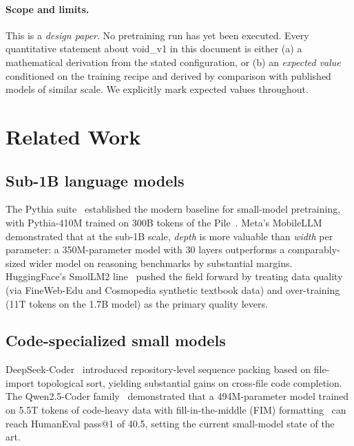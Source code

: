 \documentclass[11pt,a4paper]{article}
\theoremstyle{definition}
\theoremstyle{remark}
\begin{document}
\paragraph{Scope and limits.} This is a \emph{design paper}. No pretraining
run has yet been executed. Every quantitative statement about void\_v1 in
this document is either (a) a mathematical derivation from the stated
configuration, or (b) an \emph{expected value} conditioned on the training
recipe and derived by comparison with published models of similar scale.
We explicitly mark expected values throughout.

\section{Related Work}
\label{sec:related}

\subsection{Sub-1B language models}

The Pythia suite~\citep{biderman2023pythia} established the modern baseline
for small-model pretraining, with Pythia-410M trained on 300B tokens of the
Pile~\citep{gao2020pile}. Meta's MobileLLM~\citep{liu2024mobilellm}
demonstrated that at the sub-1B scale, \emph{depth} is more valuable than
\emph{width} per parameter: a 350M-parameter model with 30 layers
outperforms a comparably-sized wider model on reasoning benchmarks by
substantial margins. HuggingFace's SmolLM2 line~\citep{allal2025smollm2}
pushed the field forward by treating data quality (via FineWeb-Edu and
Cosmopedia synthetic textbook data) and over-training (11T tokens on the
1.7B model) as the primary quality levers.

\subsection{Code-specialized small models}

DeepSeek-Coder~\citep{guo2024deepseekcoder} introduced repository-level
sequence packing based on file-import topological sort, yielding
substantial gains on cross-file code completion. The Qwen2.5-Coder
family~\citep{hui2024qwen25coder} demonstrated that a 494M-parameter model
trained on 5.5T tokens of code-heavy data with fill-in-the-middle (FIM)
formatting~\citep{bavarian2022fim} can reach HumanEval pass@1 of 40.5,
setting the current small-model state of the art.
\end{document}
